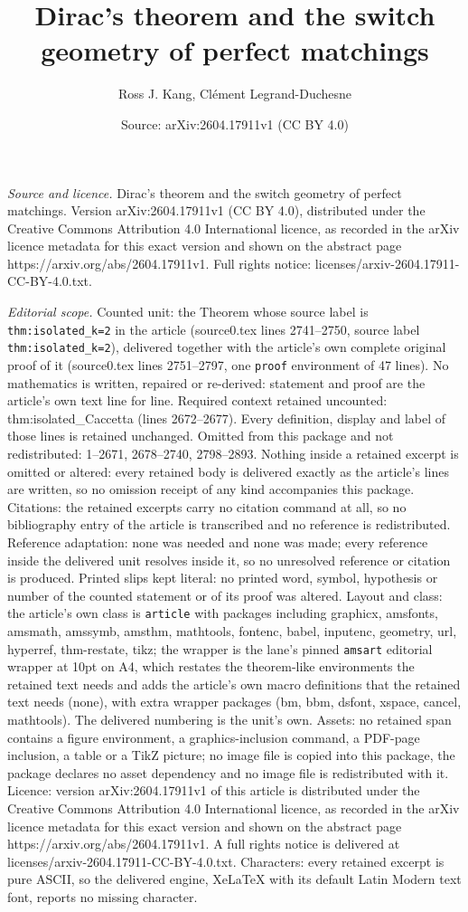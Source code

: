 \documentclass[10pt,a4paper]{amsart}
\title[Dirac's theorem and the switch geometry of perfect matchings]{Dirac's theorem and the switch geometry of perfect matchings}
\author{Ross J. Kang, Cl\'ement Legrand-Duchesne}
\date{Source: arXiv:2604.17911v1 (CC BY 4.0)}
\begin{document}
\maketitle

\noindent\emph{Source and licence.} Dirac's theorem and the switch geometry of perfect matchings. Version arXiv:2604.17911v1 (CC BY 4.0), distributed under the Creative Commons Attribution 4.0 International licence, as recorded in the arXiv licence metadata for this exact version and shown on the abstract page https://arxiv.org/abs/2604.17911v1. Full rights notice: licenses/arxiv-2604.17911-CC-BY-4.0.txt.\par\smallskip

\noindent\textit{Editorial scope.} Counted unit: the Theorem whose source label is \texttt{thm:isolated\_k=2} in the article (source0.tex lines 2741--2750, source label \texttt{thm:isolated\_k=2}), delivered together with the article's own complete original proof of it (source0.tex lines 2751--2797, one \texttt{proof} environment of 47 lines). No mathematics is written, repaired or re-derived: statement and proof are the article's own text line for line. Required context retained uncounted: thm:isolated\_Caccetta (lines 2672--2677). Every definition, display and label of those lines is retained unchanged. Omitted from this package and not redistributed: 1--2671, 2678--2740, 2798--2893. Nothing inside a retained excerpt is omitted or altered: every retained body is delivered exactly as the article's lines are written, so no omission receipt of any kind accompanies this package. Citations: the retained excerpts carry no citation command at all, so no bibliography entry of the article is transcribed and no reference is redistributed. Reference adaptation: none was needed and none was made; every reference inside the delivered unit resolves inside it, so no unresolved reference or citation is produced. Printed slips kept literal: no printed word, symbol, hypothesis or number of the counted statement or of its proof was altered. Layout and class: the article's own class is \texttt{article} with packages including graphicx, amsfonts, amsmath, amssymb, amsthm, mathtools, fontenc, babel, inputenc, geometry, url, hyperref, thm-restate, tikz; the wrapper is the lane's pinned \texttt{amsart} editorial wrapper at 10pt on A4, which restates the theorem-like environments the retained text needs and adds the article's own macro definitions that the retained text needs (none), with extra wrapper packages (bm, bbm, dsfont, xspace, cancel, mathtools). The delivered numbering is the unit's own. Assets: no retained span contains a figure environment, a graphics-inclusion command, a PDF-page inclusion, a table or a TikZ picture; no image file is copied into this package, the package declares no asset dependency and no image file is redistributed with it. Licence: version arXiv:2604.17911v1 of this article is distributed under the Creative Commons Attribution 4.0 International licence, as recorded in the arXiv licence metadata for this exact version and shown on the abstract page https://arxiv.org/abs/2604.17911v1. A full rights notice is delivered at licenses/arxiv-2604.17911-CC-BY-4.0.txt. Characters: every retained excerpt is pure ASCII, so the delivered engine, XeLaTeX with its default Latin Modern text font, reports no missing character.
\end{document}
